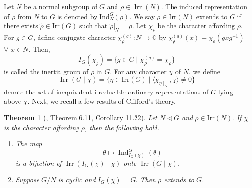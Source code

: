 \documentclass[a4paper,11pt]{amsart}
\numberwithin{equation}{section}
\numberwithin{equation}{subsection}
\newtheorem{theorem}{Theorem}[section]
\newcommand{\C}{\mathbb{C}}
\newcommand{\irr}{\mathrm{Irr}}
\newcommand{\poonam}[1]{{\color{blue} #1}}
\begin{document}
	
	
	
	Let $N$ be a normal subgroup of $G$ and  $\rho \in \operatorname{Irr}(N)$. The induced representation of $\rho$ from $N$ to $G$ is denoted by $\mathrm{Ind}_N^G(\rho)$. We say $\rho \in \mathrm{Irr}(N)$  extends to $G$ if there exists $\tilde{\rho} \in \mathrm{Irr}(G)$ such that $\tilde{\rho}|_N = \rho$.
	Let $\chi_\rho$ be the character affording $\rho$. For $g \in G$, define conjugate character $\chi_\rho^{(g)}: N \to \C$ by $\chi_\rho^{(g)}(x) = \chi_\rho(gxg^{-1})$ $\forall$ $x \in N$. Then, 
	\[
	I_G(\chi_\rho) = \{ g \in G \mid \chi_\rho^{(g)} = \chi_\rho \}
	\]
	is called the inertia group of $\rho$ in $G$. For any character $\chi$ of $N$, we define  $$\operatorname{Irr}(G \mid \chi)= \{\eta \in \irr(G) \mid \langle \chi_{\eta\mid_N}, \chi \rangle \neq 0\}$$ denote the set of inequivalent irreducible ordinary representations of $G$ lying above $\chi$. 
	Next, we recall a few results of Clifford's theory.
	\begin{theorem}[\cite{isaacs}, Theorem 6.11, Corollary 11.22] Let $N \triangleleft G$ and $\rho \in \mathrm{Irr}(N)$. If $\chi$ is the character affording $\rho$, then the following hold.
		
		\begin{enumerate} \label{Clifford's theory}
			
			\item The map 
			\[
			\theta \mapsto \operatorname{Ind}^{G}_{I_G(\chi)}(\theta)
			\] is a bijection of $\operatorname{Irr}(I_G(\chi) \mid \chi)$ onto $\operatorname{Irr}(G \mid \chi)$.
			
			\item Suppose $G/N$ is cyclic and $I_G(\chi) = G$. Then $\rho$ extends  to $G$.
			
		\end{enumerate}    
	\end{theorem}
	
\end{document}
